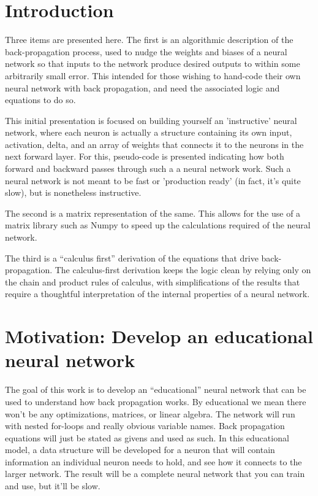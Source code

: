\documentclass[12pt]{article}
\begin{document}
\tableofcontents

\section{Introduction}

Three items are presented here. The first is an algorithmic description of the back-propagation process, used to nudge the weights and biases of a neural network so that inputs to the network produce desired outputs to within some arbitrarily small error. This intended for those  wishing to hand-code their own neural network with back propagation, and need the associated logic and equations to do so. 

This initial presentation is focused on building yourself an 'instructive' neural network, where each neuron is actually a structure containing its own input, activation, delta, and an array of weights that connects it to the neurons in the next forward layer. For this,  pseudo-code is presented indicating how both forward and backward passes through such a a neural network work.  Such a neural network is not meant to be fast or 'production ready' (in fact, it's quite slow), but is nonetheless instructive.

The second is a matrix representation of the same. This allows for the use of a matrix library such as Numpy to speed up the calculations required of the neural network.

The third is a ``calculus first'' derivation of the equations that drive back-propagation. The calculus-first derivation keeps the logic clean by relying only on the chain and product rules of calculus, with simplifications of the results that require a thoughtful interpretation of the internal properties of a neural network.



\section{Motivation: Develop an educational neural network}

The goal of this work is to develop an ``educational'' neural network that  can be used to understand how back propagation works.  By educational we mean there won't be any optimizations, matrices, or linear algebra. The network will run with nested for-loops and really obvious variable names.  Back propagation equations will just be stated as givens and used as such.  In this educational model, a data structure will be developed for a neuron that will contain information an individual neuron needs to hold, and  see how it connects to the larger network.  The result will be a complete neural network that you can train and use, but it'll be slow.
\end{document}
